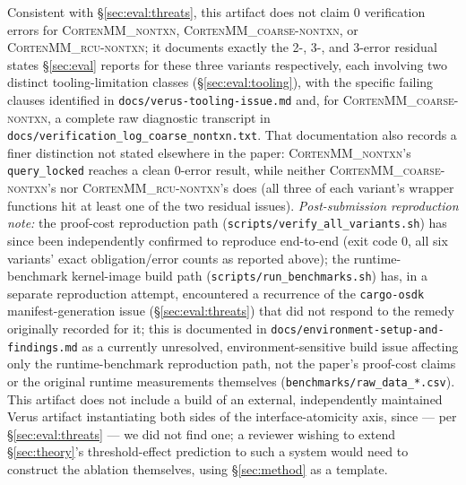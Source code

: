 \documentclass[10pt]{article}
\newcommand{\corten}[1]{\textsc{CortenMM\_#1}}
\newcommand{\vfn}[1]{\texttt{#1}}
\begin{document}
Consistent with \S\ref{sec:eval:threats}, this artifact does not claim
0 verification errors for \corten{nontxn}, \corten{coarse-nontxn}, or
\corten{rcu-nontxn}; it documents exactly the 2-, 3-, and 3-error
residual states \S\ref{sec:eval} reports for these three variants
respectively, each involving two distinct tooling-limitation classes
(\S\ref{sec:eval:tooling}), with the specific failing clauses
identified in \vfn{docs/verus-tooling-issue.md} and, for
\corten{coarse-nontxn}, a complete raw diagnostic transcript in
\vfn{docs/verification\_log\_coarse\_nontxn.txt}. That documentation
also records a finer distinction not stated elsewhere in the paper:
\corten{nontxn}'s \vfn{query\_locked} reaches a clean 0-error result,
while neither \corten{coarse-nontxn}'s nor \corten{rcu-nontxn}'s does
(all three of each variant's wrapper functions hit at least one of the
two residual issues). \emph{Post-submission reproduction note:} the
proof-cost reproduction path (\vfn{scripts/verify\_all\_variants.sh})
has since been independently confirmed to reproduce end-to-end (exit
code 0, all six variants' exact obligation/error counts as reported
above); the runtime-benchmark kernel-image build path
(\vfn{scripts/run\_benchmarks.sh}) has, in a separate reproduction
attempt, encountered a recurrence of the \vfn{cargo-osdk}
manifest-generation issue (\S\ref{sec:eval:threats}) that did not
respond to the remedy originally recorded for it; this is documented
in \vfn{docs/environment-setup-and-findings.md} as a currently
unresolved, environment-sensitive build issue affecting only the
runtime-benchmark reproduction path, not the paper's proof-cost claims
or the original runtime measurements themselves
(\vfn{benchmarks/raw\_data\_*.csv}). This artifact does not include a build of an
external, independently maintained Verus artifact instantiating both
sides of the interface-atomicity axis, since --- per
\S\ref{sec:eval:threats} --- we did not find one; a reviewer wishing to
extend \S\ref{sec:theory}'s threshold-effect prediction to such a
system would need to construct the ablation themselves, using
\S\ref{sec:method} as a template.
\end{document}
